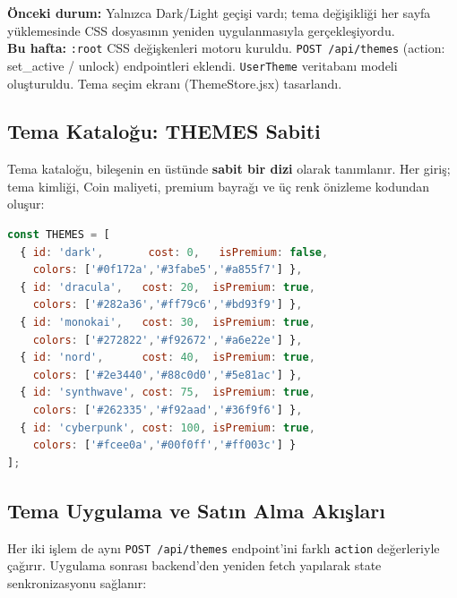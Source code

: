 \documentclass[12pt,a4paper]{article}
\begin{document}
\begin{infobox}
  \small
  \textbf{Önceki durum:} Yalnızca Dark/Light geçişi vardı; tema değişikliği her sayfa yüklemesinde CSS dosyasının yeniden uygulanmasıyla gerçekleşiyordu.\\
  \textbf{Bu hafta:} \texttt{:root} CSS değişkenleri motoru kuruldu. \texttt{POST /api/themes} (action: set\_active / unlock) endpointleri eklendi. \texttt{UserTheme} veritabanı modeli oluşturuldu. Tema seçim ekranı (ThemeStore.jsx) tasarlandı.
\end{infobox}

\subsection{Tema Kataloğu: THEMES Sabiti}

Tema kataloğu, bileşenin en üstünde \textbf{sabit bir dizi} olarak tanımlanır. Her giriş; tema kimliği, Coin maliyeti, premium bayrağı ve üç renk önizleme kodundan oluşur:

\begin{lstlisting}[language=JavaScript, caption=ThemeStore.jsx -- Tema Kataloğu (satır 4--13)]
const THEMES = [
  { id: 'dark',       cost: 0,   isPremium: false,
    colors: ['#0f172a','#3fabe5','#a855f7'] },
  { id: 'dracula',   cost: 20,  isPremium: true,
    colors: ['#282a36','#ff79c6','#bd93f9'] },
  { id: 'monokai',   cost: 30,  isPremium: true,
    colors: ['#272822','#f92672','#a6e22e'] },
  { id: 'nord',      cost: 40,  isPremium: true,
    colors: ['#2e3440','#88c0d0','#5e81ac'] },
  { id: 'synthwave', cost: 75,  isPremium: true,
    colors: ['#262335','#f92aad','#36f9f6'] },
  { id: 'cyberpunk', cost: 100, isPremium: true,
    colors: ['#fcee0a','#00f0ff','#ff003c'] }
];
\end{lstlisting}

\subsection{Tema Uygulama ve Satın Alma Akışları}

Her iki işlem de aynı \texttt{POST /api/themes} endpoint'ini farklı \texttt{action} değerleriyle çağırır. Uygulama sonrası backend'den yeniden fetch yapılarak state senkronizasyonu sağlanır:
\end{document}
